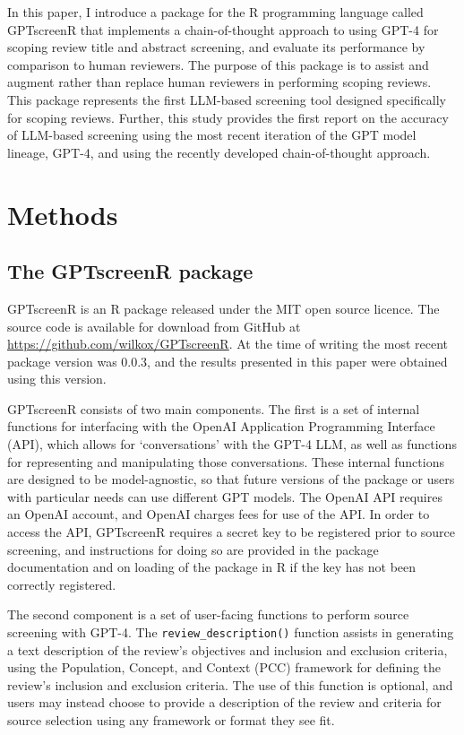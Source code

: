 \documentclass[10pt,a4paper,twocolumn]{article}
\begin{document}
In this paper, I introduce a package for the R programming language \cite{R.2023} called GPTscreenR that implements a chain-of-thought approach to using GPT-4 for scoping review title and abstract screening, and evaluate its performance by comparison to human reviewers. The purpose of this package is to assist and augment rather than replace human reviewers in performing scoping reviews. This package represents the first LLM-based screening tool designed specifically for scoping reviews. Further, this study provides the first report on the accuracy of LLM-based screening using the most recent iteration of the GPT model lineage, GPT-4, and using the recently developed chain-of-thought approach.

\section{Methods}

\subsection{The GPTscreenR package}

GPTscreenR is an R \cite{R.2023} package released under the MIT open source licence. The source code is available for download from GitHub at \url{https://github.com/wilkox/GPTscreenR}. At the time of writing the most recent package version was 0.0.3, and the results presented in this paper were obtained using this version.

GPTscreenR consists of two main components. The first is a set of internal functions for interfacing with the OpenAI Application Programming Interface (API), which allows for `conversations' with the GPT-4 LLM, as well as functions for representing and manipulating those conversations. These internal functions are designed to be model-agnostic, so that future versions of the package or users with particular needs can use different GPT models. The OpenAI API requires an OpenAI account, and OpenAI charges fees for use of the API. In order to access the API, GPTscreenR requires a secret key to be registered prior to source screening, and instructions for doing so are provided in the package documentation and on loading of the package in R if the key has not been correctly registered.

The second component is a set of user-facing functions to perform source screening with GPT-4. The \texttt{review\_description()} function assists in generating a text description of the review's objectives and inclusion and exclusion criteria, using the Population, Concept, and Context (PCC) framework \cite{Peters.2020, JBI.2020} for defining the review's inclusion and exclusion criteria. The use of this function is optional, and users may instead choose to provide a description of the review and criteria for source selection using any framework or format they see fit.
\end{document}
